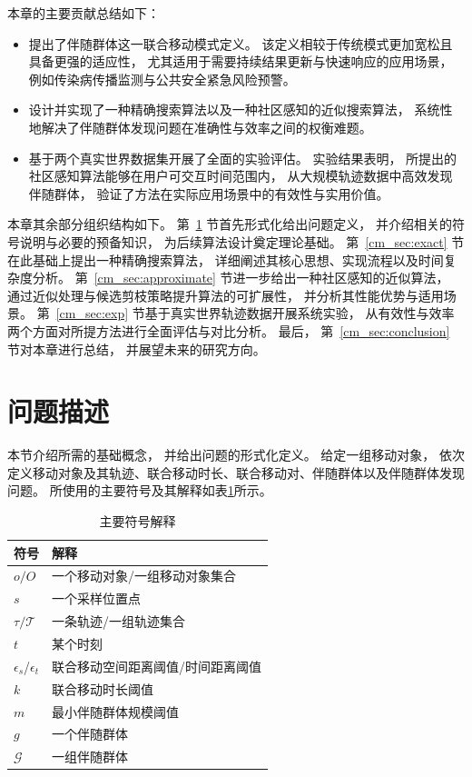 本章的主要贡献总结如下：
\begin{itemize}
    \item 提出了伴随群体这一联合移动模式定义。 该定义相较于传统模式更加宽松且具备更强的适应性， 尤其适用于需要持续结果更新与快速响应的应用场景， 例如传染病传播监测与公共安全紧急风险预警。
    \item 设计并实现了一种精确搜索算法以及一种社区感知的近似搜索算法， 系统性地解决了伴随群体发现问题在准确性与效率之间的权衡难题。
    \item 基于两个真实世界数据集开展了全面的实验评估。 实验结果表明， 所提出的社区感知算法能够在用户可交互时间范围内， 从大规模轨迹数据中高效发现伴随群体， 验证了方法在实际应用场景中的有效性与实用价值。
\end{itemize}

本章其余部分组织结构如下。 第~\ref{cm_sec:problem} 节首先形式化给出问题定义， 并介绍相关的符号说明与必要的预备知识， 为后续算法设计奠定理论基础。 第~\ref{cm_sec:exact} 节在此基础上提出一种精确搜索算法， 详细阐述其核心思想、实现流程以及时间复杂度分析。 第~\ref{cm_sec:approximate} 节进一步给出一种社区感知的近似算法， 通过近似处理与候选剪枝策略提升算法的可扩展性， 并分析其性能优势与适用场景。 第~\ref{cm_sec:exp} 节基于真实世界轨迹数据开展系统实验， 从有效性与效率两个方面对所提方法进行全面评估与对比分析。 最后， 第~\ref{cm_sec:conclusion} 节对本章进行总结， 并展望未来的研究方向。

\section{问题描述}
\label{cm_sec:problem}

本节介绍所需的基础概念， 并给出问题的形式化定义。 给定一组移动对象， 依次定义移动对象及其轨迹、联合移动时长、联合移动对、伴随群体以及伴随群体发现问题。 所使用的主要符号及其解释如表\ref{cm_tab:notation}所示。

\begin{table}[!ht]
    \caption{主要符号解释}\label{cm_tab:notation}
    \begin{tabular}{ll}
        \toprule
		\bfseries 符号 & \bfseries 解释 \\
        \midrule
        $o/O$ & 一个移动对象/一组移动对象集合\\
        $s$ & 一个采样位置点\\
        $\tau/\mathcal{T}$ & 一条轨迹/一组轨迹集合 \\
        $t$ & 某个时刻\\
        $\epsilon_s$/$\epsilon_t$ & 联合移动空间距离阈值/时间距离阈值\\
        $k$ & 联合移动时长阈值\\
        $m$ & 最小伴随群体规模阈值 \\
        $g$ &一个伴随群体\\
        $\mathcal{G}$ & 一组伴随群体 \\
        \bottomrule
    \end{tabular}
\end{table}

